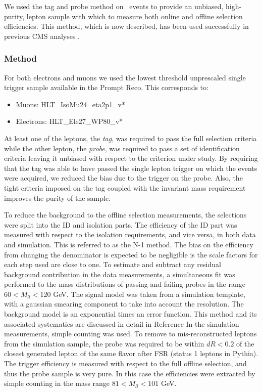  
We used the tag and probe method on \dyll~events to provide an unbiased, high-purity, 
lepton sample with which to measure both online and offline selection efficiencies.
This method, which is now described, 
has been used successfully in previous CMS analyses \cite{ref:tagprobe_mit_w}\cite{ref:tagprobe_snt_top}.

\subsubsection{Method}
For both electrons and muons we used the lowest threshold unprescaled single trigger sample
available in the Prompt Reco.  This corresponds to:

\begin{itemize}
    \item Muons: HLT\_IsoMu24\_eta2p1\_v*
    \item Electrons: HLT\_Ele27\_WP80\_v*
\end{itemize}

At least one of the leptons, the {\it tag}, was required to pass the full selection criteria
while the other lepton, the {\it probe}, was required to pass a set of identification criteria leaving 
it unbiased with respect to the criterion under study. By requiring that the tag was able to have passed 
the single lepton trigger on which the events were acquired, we reduced the bias due to the trigger on 
the probe. Also, the tight criteria imposed on the tag coupled with the invariant mass requirement 
improves the purity of the sample. 

To reduce the background to the offline selection measurements,
the selections were split into the ID and isolation parts.  
The efficiency of the ID part was measured with respect to the isolation
requirements, and vice versa, in both data and simulation.
This is referred to as the N-1 method.
The bias on the efficiency from changing the denominator is
expected to be negligible is the scale factors for each step used
are close to one.
To estimate and subtract any residual background contribution in the data measurements,
a simultaneous fit was performed to the mass distributions
of passing and failing probes in the range $60<M_{ll}<120$ GeV.
The signal model was taken from a simulation template, 
with a gaussian smearing component to take into account the resolution.
The background model is an exponential times an error function.
This method and its associated systematics are discussed in detail in Reference \cite{ref:tagprobe_mit_w}
In the simulation measurements, simple counting was used.
To remove to mis-reconstructed leptons from the simulation sample,
the probe was required to be within $dR<0.2$ of the closest generated lepton
of the same flavor after FSR (status 1 leptons in Pythia). 
The trigger efficiency is measured with respect to the full offline selection,
and thus the probe sample is very pure.  In this case the efficiencies were
extracted by simple counting in the mass range $81<M_{ll}<101$ GeV.


